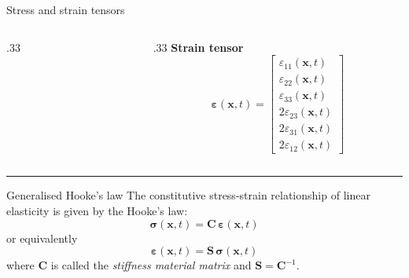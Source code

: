 \documentclass[aspectratio=169]{beamer}
\begin{document}
{\begin{frame}{Stress and strain tensors}
\begin{columns}[T]
\begin{column}{.33\textwidth}
\begin{center}
      \end{center}
    \end{column}
    \hfill
    \begin{column}{.33\textwidth}
      \small\centering \textbf{Strain tensor}
      $$\boldsymbol{\varepsilon}(\mathbf x,t)=\begin{bmatrix}\varepsilon_{11}(\mathbf x,t)\\ \varepsilon_{22}(\mathbf x,t)\\ \varepsilon_{33}(\mathbf x,t)\\ 2\varepsilon_{23}(\mathbf x,t)\\ 2\varepsilon_{31}(\mathbf x,t)\\ 2\varepsilon_{12}(\mathbf x,t)\end{bmatrix}$$
    \end{column}
  \end{columns}
  \vspace{4pt}\noindent\color{darkred}\rule{\linewidth}{0.1mm}
  {\footnotesize
    \begin{block}{Generalised Hooke’s law}
      The constitutive stress-strain relationship of linear elasticity is given by the Hooke’s law:
      $$\boldsymbol\sigma(\mathbf x,t)       = \mathbf C\,\boldsymbol\varepsilon(\mathbf x,t)$$
      or equivalently
      $$\boldsymbol\varepsilon(\mathbf x,t)  = \mathbf S\, \boldsymbol\sigma(\mathbf x,t)$$
      where $\mathbf C$ is called the \emph{stiffness material matrix} and $\mathbf S=\mathbf C^{-1}$.
    \end{block}
  }
\end{frame}

}
\end{document}
